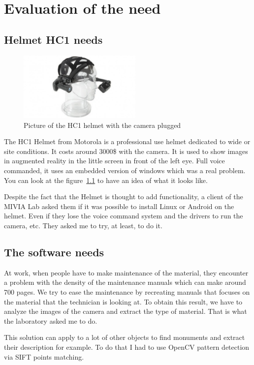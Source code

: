 \chapter{Evaluation of the need}

\section{Helmet HC1 needs}
\begin{figure}
 \begin{center}
	 \includegraphics[width=6cm]{images_not_compressed/motorola_hc1.jpg}
		\caption{Picture of the HC1 helmet with the camera plugged}
		\label{hc1}
	 \end{center}
 \end{figure}

 \par The HC1 Helmet from Motorola is a professional use helmet dedicated to wide or site conditions. It costs around 3000\$ with the camera. It is used to show images in augmented reality in the little screen in front of the left eye. Full voice commanded, it uses an embedded version of windows which was a real problem. You can look at the figure~\ref{hc1} to have an idea of what it looks like.
 
 \par Despite the fact that the Helmet is thought to add functionality, a client of the MIVIA Lab asked them if it was possible to install Linux or Android on the helmet. Even if they lose the voice command system and the drivers to run the camera, etc. They asked me to try, at least, to do it.

\section{The software needs}
 \par At work, when people have to make maintenance of the material, they encounter a problem with the density of the maintenance manuals which can make around 700 pages. We try to ease the maintenance by recreating manuals that focuses on the material that the technician is looking at. To obtain this result, we have to analyze the images of the camera and extract the type of material. That is what the laboratory asked me to do.
 \par This solution can apply to a lot of other objects to find monuments and extract their description for example. To do that I had to use OpenCV pattern detection via SIFT points matching.  
	